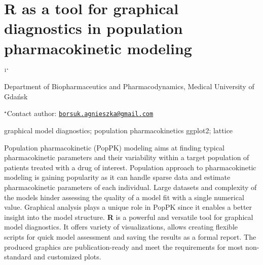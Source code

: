 \documentclass[\main/boa.tex]{subfiles}
\begin{document}
\section{R as a tool for graphical diagnostics in population pharmacokinetic
modeling}

\begin{center}
  {\bf {}$^{1^\star}$}
\end{center}

\vskip 0.3cm

\begin{affiliations}
\begin{enumerate}
\begin{minipage}{0.915\textwidth}
\centering
\item Department of Biopharmaceutics and Pharmacodynamics, Medical University
of Gdańsk \\[-2pt]
\end{minipage}
\end{enumerate}
$^\star$Contact author: \href{mailto:borsuk.agnieszka@gmail.com}{\nolinkurl{borsuk.agnieszka@gmail.com}}\\
\end{affiliations}

\vskip 0.5cm

\begin{minipage}{0.915\textwidth}
\keywords graphical model diagnostics; population pharmacokinetics
\packages ggplot2; lattice
\end{minipage}

\vskip 0.8cm

Population pharmacokinetic (PopPK) modeling aims at finding typical
pharmacokinetic parameters and their variability within a target
population of patients treated with a drug of interest. Population
approach to pharmacokinetic modeling is gaining popularity as it can
handle sparse data and estimate pharmacokinetic parameters of each
individual. Large datasets and complexity of the models hinder assessing
the quality of a model fit with a single numerical value. Graphical
analysis plays a unique role in PopPK since it enables a better insight
into the model structure. \textbf{R} is a powerful and versatile tool
for graphical model diagnostics. It offers variety of visualizations,
allows creating flexible scripts for quick model assessment and saving
the results as a formal report. The produced graphics are
publication-ready and meet the requirements for most non-standard and
customized plots.
\end{document}
